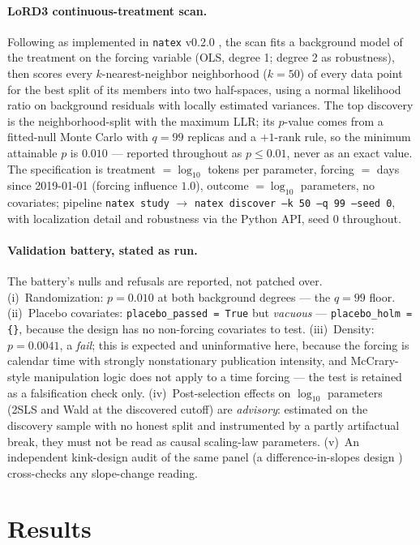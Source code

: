 \documentclass[11pt]{article}
\newcommand{\natex}{\texttt{natex}}
\begin{document}
\paragraph{LoRD3 continuous-treatment scan.} Following \cite{herlands2018} as
implemented in \natex{} v0.2.0 \cite{natex}, the scan fits a background model
of the treatment on the forcing variable (OLS, degree 1; degree 2 as
robustness), then scores every $k$-nearest-neighbor neighborhood ($k = 50$)
of every data point for the best split of its members into two half-spaces,
using a normal likelihood ratio on background residuals with locally
estimated variances. The top discovery is the neighborhood-split with the
maximum LLR; its $p$-value comes from a fitted-null Monte Carlo with $q = 99$
replicas and a $+1$-rank rule, so the minimum attainable $p$ is $0.010$ ---
reported throughout as $p \leq 0.01$, never as an exact value. The
specification is treatment $= \log_{10}$ tokens per parameter, forcing $=$
days since 2019-01-01 (forcing influence $1.0$), outcome $= \log_{10}$
parameters, no covariates; pipeline \texttt{natex study} $\to$
\texttt{natex discover --k 50 --q 99 --seed 0}, with localization detail and
robustness via the Python API, seed 0 throughout.

\paragraph{Validation battery, stated as run.} The battery's nulls and
refusals are reported, not patched over. (i)~Randomization: $p = 0.010$ at
both background degrees --- the $q=99$ floor. (ii)~Placebo covariates:
\texttt{placebo\_passed = True} but \emph{vacuous} ---
\texttt{placebo\_holm = \{\}}, because the design has no non-forcing
covariates to test. (iii)~Density: $p = 0.0041$, a \emph{fail}; this is
expected and uninformative here, because the forcing is calendar time with
strongly nonstationary publication intensity, and McCrary-style manipulation
logic \cite{mccrary2008} does not apply to a time forcing --- the test is
retained as a falsification check only. (iv)~Post-selection effects on
$\log_{10}$ parameters (2SLS and Wald at the discovered cutoff) are
\emph{advisory}: estimated on the discovery sample with no honest split and
instrumented by a partly artifactual break, they must not be read as causal
scaling-law parameters. (v)~An independent kink-design audit of the same
panel (a difference-in-slopes design \cite{bockerman2025}) cross-checks any
slope-change reading.

\section{Results}\label{sec:results}
\end{document}
